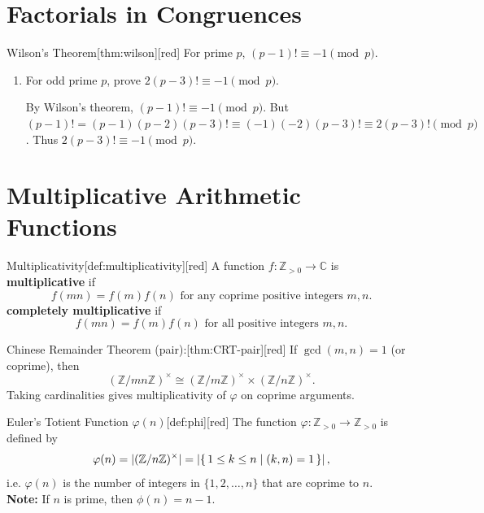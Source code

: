 \documentclass[11pt]{article}
\begin{document}
\section*{Factorials in Congruences}


\begin{define}{Wilson's Theorem}[thm:wilson][red]
  For prime $p$, $(p-1)!\equiv-1\pmod p$.
\end{define}


\begin{enumerate}
\item For odd prime $p$, prove $2(p-3)!\equiv-1\pmod p$.
\begin{subprove}
  By Wilson's theorem, $(p-1)! \equiv -1 \pmod p$. But $(p-1)! = (p-1)(p-2)(p-3)! \equiv (-1)(-2)(p-3)! \equiv 2(p-3)! \pmod p$. Thus $2(p-3)! \equiv -1 \pmod p$.
\end{subprove}
\end{enumerate}


\newpage





\section*{Multiplicative Arithmetic Functions}


\begin{define}{Multiplicativity}[def:multiplicativity][red]
  A function $f:\mathbb{Z}_{>0}\to\mathbb{C}$ is \textbf{multiplicative} if 
  \[
    f(mn) = f(m)f(n) \text{ for any coprime positive integers } m,n.
  \]
  \textbf{completely multiplicative} if
  \[
    f(mn) = f(m)f(n) \text{ for all positive integers } m,n.
  \]
\end{define}


\begin{define}{Chinese Remainder Theorem (pair):}[thm:CRT-pair][red]
  If $\gcd(m,n)=1$ (or coprime), then
  \[(\mathbb{Z}/mn\mathbb{Z})^\times\cong(\mathbb{Z}/m\mathbb{Z})^\times\times(\mathbb{Z}/n\mathbb{Z})^\times.
  \]
  Taking cardinalities gives multiplicativity of $\varphi$ on coprime arguments.
\end{define}


\begin{define}{Euler's Totient Function $\varphi(n)$}[def:phi][red]
  The function $\varphi:\mathbb{Z}_{>0}\to\mathbb{Z}_{>0}$ is defined by
  \[
    \varphi(n)=|(\mathbb{Z}/n\mathbb{Z})^\times| = \left|\{\,1 \leq k \leq n \mid \left(k,n\right) = 1\,\}\right|,
  \]
  i.e. $\varphi(n)$ is the number of integers in $\{1,2,\dots,n\}$ 
  that are coprime to $n$.\\
  \textbf{Note:} If $n$ is prime, then $\phi(n) = n-1$.
\end{define}
\end{document}
